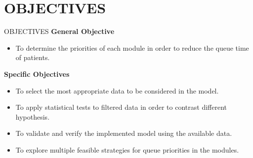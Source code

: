 \section{OBJECTIVES}
\begin{frame}{OBJECTIVES}
\textbf{General Objective}
    \begin{itemize}
        \item To determine the priorities of each module in order to reduce the queue time of patients.
    \end{itemize}
    \vspace{.5cm}
\textbf{Specific Objectives}
    \begin{itemize}
        \item To select the most appropriate data to be considered in the model.
        \item To apply statistical tests  to filtered data in order to contrast different hypothesis.
        \item To validate and verify the implemented model using the available data.
        \item To explore multiple feasible strategies for queue priorities in the modules.
    \end{itemize}
\end{frame}